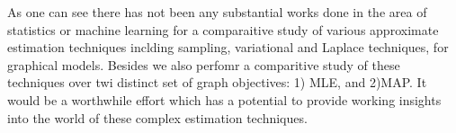 As one can see there has not been any substantial works done in the area of
statistics or machine learning for a comparaitive study of various approximate
estimation techniques inclding sampling, variational and Laplace techniques, for
graphical models. Besides we also perfomr a comparitive study of these
techniques over twi distinct set of graph objectives: 1) MLE, and 2)MAP. It
would be a worthwhile effort which has a potential to provide working insights
into the world of these complex estimation techniques.
